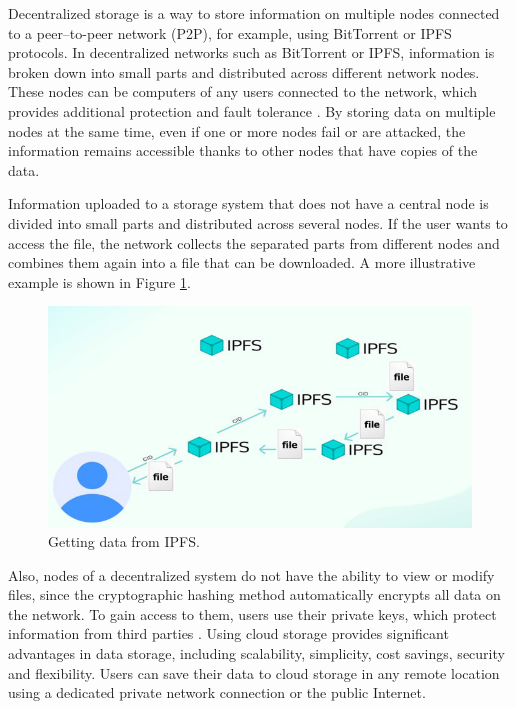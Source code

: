 \documentclass[10pt,conference,a4paper]{IEEEtran_EDM}
\begin{document}
Decentralized storage is a way to store information on multiple nodes connected to a peer–to-peer network (P2P), for example, using BitTorrent or IPFS \cite{IPFS} protocols.
In decentralized networks such as BitTorrent or IPFS, information is broken down into small parts and distributed across different network nodes.
These nodes can be computers of any users connected to the network, which provides additional protection and fault tolerance \cite{Anisimov}.
By storing data on multiple nodes at the same time, even if one or more nodes fail or are attacked, the information remains accessible thanks to other nodes that have copies of the data.

Information uploaded to a storage system that does not have a central node is divided into small parts and distributed across several nodes. If the user wants to access the file, the network collects the separated parts from different nodes and combines them again into a file that can be downloaded. A more illustrative example is shown in Figure \ref{data_IPFS}.

\begin{figure}[htbp]
\centerline{\includegraphics[scale=0.71]{fig1.png}}
\caption{Getting data from IPFS.}
\label{data_IPFS}
\end{figure}

Also, nodes of a decentralized system do not have the ability to view or modify files, since the cryptographic hashing method automatically encrypts all data on the network.
To gain access to them, users use their private keys, which protect information from third parties \cite{Web3Browsers}.
Using cloud storage provides significant advantages in data storage, including scalability, simplicity, cost savings, security and flexibility.
Users can save their data to cloud storage in any remote location using a dedicated private network connection or the public Internet.
\end{document}
